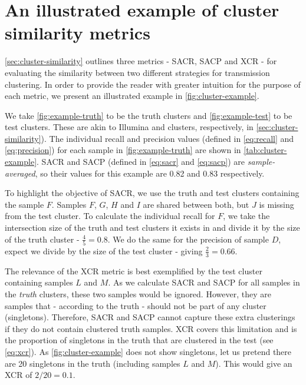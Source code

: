 
\section{An illustrated example of cluster similarity metrics}
\label{app:cluster-example}

\autoref{sec:cluster-similarity} outlines three metrics - SACR, SACP and XCR - for evaluating the similarity between two different strategies for transmission clustering. In order to provide the reader with greater intuition for the purpose of each metric, we present an illustrated example in \autoref{fig:cluster-example}. 

We take \autoref{fig:example-truth} to be the truth clusters and \autoref{fig:example-test} to be test clusters. These are akin to Illumina and \ont{} clusters, respectively, in \autoref{sec:cluster-similarity}). The individual recall and precision values (defined in \autoref{eq:recall} and \autoref{eq:precision}) for each sample in \autoref{fig:example-truth} are shown in \autoref{tab:cluster-example}. SACR and SACP (defined in \autoref{eq:sacr} and \autoref{eq:sacp}) are \emph{sample-averaged}, so their values for this example are 0.82 and 0.83 respectively. 

To highlight the objective of SACR, we use the truth and test clusters containing the sample $F$. Samples $F$, $G$, $H$ and $I$ are shared between both, but $J$ is missing from the test cluster. To calculate the individual recall for $F$, we take the intersection size of the truth and test clusters it exists in and divide it by the size of the truth cluster - $\frac{4}{5}=0.8$. We do the same for the precision of sample $D$, expect we divide by the size of the test cluster - giving $\frac{2}{3}=0.66$. 

The relevance of the XCR metric is best exemplified by the test cluster containing samples $L$ and $M$. As we calculate SACR and SACP for all samples in the \emph{truth} clusters, these two samples would be ignored. However, they are samples that - according to the truth - should not be part of any cluster (singletons). Therefore, SACR and SACP cannot capture these extra clusterings if they do not contain clustered truth samples. XCR covers this limitation and is the proportion of singletons in the truth that are clustered in the test (see \autoref{eq:xcr}). As \autoref{fig:cluster-example} does not show singletons, let us pretend there are 20 singletons in the truth (including samples $L$ and $M$). This would give an XCR of $2/20=0.1$.

